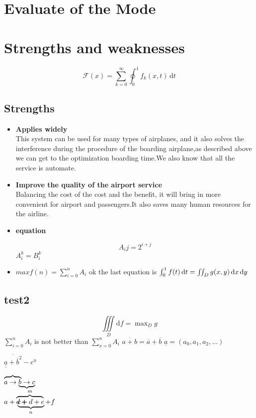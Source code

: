 \documentclass{mcmthesis}
\begin{document}
\section{Evaluate of the Mode}

\section{Strengths and weaknesses}
\[
\mathcal{F}(x) = \sum_{k = 0}^\infty
\oint_0^1 f_k(x,t) \, \mathrm{d}t
\]

\subsection{Strengths}
\begin{itemize}
\item \textbf{Applies widely}\\
This  system can be used for many types of airplanes, and it also
solves the interference during  the procedure of the boarding
airplane,as described above we can get to the  optimization
boarding time.We also know that all the service is automate.

\item \textbf{Improve the quality of the airport service}\\
Balancing the cost of the cost and the benefit, it will bring in
more convenient  for airport and passengers.It also saves many
human resources for the airline. 

\item \textbf{equation}

\[
A_ij = 2^{i+j}
\]
$A_i^k = B_i^k$

\item $max f(n) = \sum_{i = 0}^n A_i$ ok the last equation is $\int_0^1 f(t) \mathop{}\!\mathrm{d} t
 = \iint_D g(x,y) \mathop{}\!\mathrm{d} x \mathop{}\!\mathrm{d} y$
\end{itemize}


\subsection{test2}
\[
 \iiint\limits_D \mathrm{d}f 
  = \max\nolimits_D g
\] $\sum\limits_{i = 0}^n A_i$ is not better than $\sum_{x = 0}^n A_i$
$\overline{a+b} = \overline a + \overline b$ $\underline a = (a_0, a_1, a_2, \dots)$

$ \overline{\underline{\underline a}
+ \overline{b}^2} - c^{\underline n}$

$\rlap{$\overbrace{\phantom{a \to b}}$} a \to \underbrace{b \to c}$\\
$a+\rlap{$\overbrace{d+\phantom{c+d}}^m$}\underbrace{c+d+e}_n+f$
\end{document}
